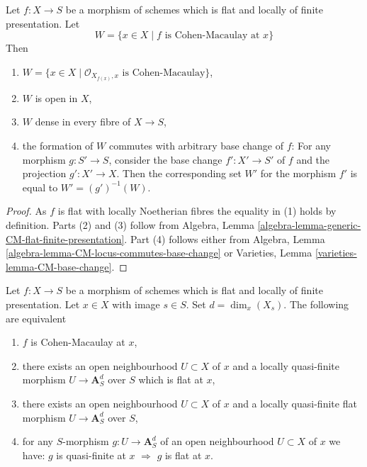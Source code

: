 \begin{lemma}
\label{lemma-flat-finite-presentation-CM-open}
Let $f : X \to S$ be a morphism of schemes which is flat and locally
of finite presentation. Let
$$
W = \{x \in X \mid f\text{ is Cohen-Macaulay at }x\}
$$
Then
\begin{enumerate}
\item $W = \{x \in X \mid \mathcal{O}_{X_{f(x)}, x}\text{ is Cohen-Macaulay}\}$,
\item $W$ is open in $X$,
\item $W$ dense in every fibre of $X \to S$,
\item the formation of $W$ commutes with arbitrary base change of $f$:
For any morphism $g : S' \to S$, consider
the base change $f' : X' \to S'$ of $f$ and the
projection $g' : X' \to X$. Then the corresponding
set $W'$ for the morphism $f'$ is equal to $W' = (g')^{-1}(W)$.
\end{enumerate}
\end{lemma}

\begin{proof}
As $f$ is flat with locally Noetherian fibres the equality in (1) holds
by definition. Parts (2) and (3) follow from
Algebra, Lemma \ref{algebra-lemma-generic-CM-flat-finite-presentation}.
Part (4) follows either from
Algebra, Lemma \ref{algebra-lemma-CM-locus-commutes-base-change}
or
Varieties, Lemma \ref{varieties-lemma-CM-base-change}.
\end{proof}

\begin{lemma}
\label{lemma-flat-finite-presentation-characterize-CM}
Let $f : X \to S$ be a morphism of schemes which is flat and locally
of finite presentation. Let $x \in X$ with image $s \in S$.
Set $d = \dim_x(X_s)$.
The following are equivalent
\begin{enumerate}
\item $f$ is Cohen-Macaulay at $x$,
\item there exists an open neighbourhood $U \subset X$ of $x$
and a locally quasi-finite morphism $U \to \mathbf{A}^d_S$ over $S$
which is flat at $x$,
\item there exists an open neighbourhood $U \subset X$ of $x$
and a locally quasi-finite flat morphism $U \to \mathbf{A}^d_S$ over $S$,
\item for any $S$-morphism $g : U \to \mathbf{A}^d_S$
of an open neighbourhood $U \subset X$ of $x$ we have:
$g$ is quasi-finite at $x$ $\Rightarrow$ $g$ is flat at $x$.
\end{enumerate}
\end{lemma}

